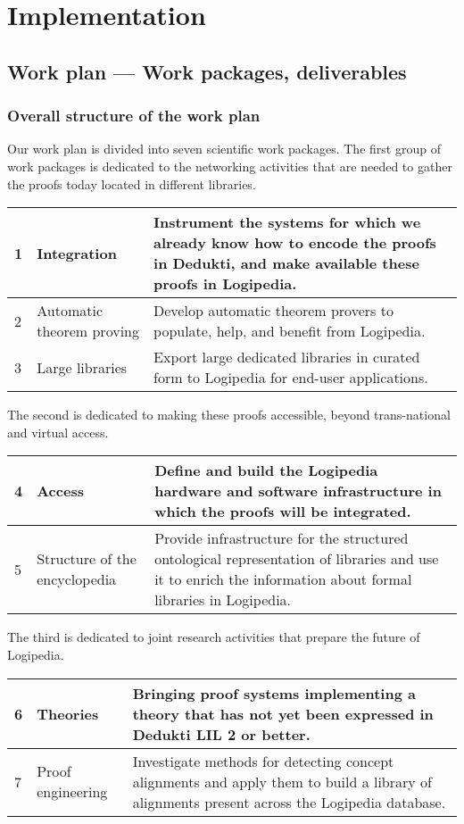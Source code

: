 \chapter{Implementation}\label{chap:implementation}

\section{Work plan --- Work packages, deliverables}

\subsection{Overall structure of the work plan}

Our work plan is divided into seven scientific work packages.
The first group of work packages is dedicated to the networking
activities that are needed to gather the proofs today located in
different libraries.
\begin{longtable}{|p{}|p{}|p{}|}
\hline
1
&
Integration
&
Instrument the systems for which we already know how to encode the
proofs in Dedukti, and make available these proofs in Logipedia.
\\
\hline
2
&
Automatic theorem proving
& 
Develop automatic theorem provers to populate,
help, and benefit from Logipedia.
\\
\hline
3
&
Large libraries
&
Export large dedicated libraries in curated form 
to Logipedia for end-user applications.
\\
\hline
\end{longtable}
The second is dedicated to making these proofs accessible, beyond
trans-national and virtual access.
\begin{longtable}{|p{}|p{}|p{}|}
\hline
4
&
Access
&
Define and build the Logipedia hardware and software infrastructure in
which the proofs will be integrated.
\\
\hline
5
&
Structure of the encyclopedia
&
Provide infrastructure for the structured ontological representation
of libraries and use it to enrich the information about formal
libraries in Logipedia.
\\
\hline
\end{longtable}
The third is dedicated to joint research activities that prepare
the future of Logipedia. 
\begin{longtable}{|p{}|p{}|p{}|}
\hline
6
&
Theories
&
Bringing proof systems implementing a theory 
that has not yet been expressed in Dedukti LIL 2 or better.
\\
\hline
7&Proof engineering &
Investigate methods for detecting concept alignments and apply
them to build a library of alignments present across the Logipedia database.
\\
\hline
\end{longtable}
